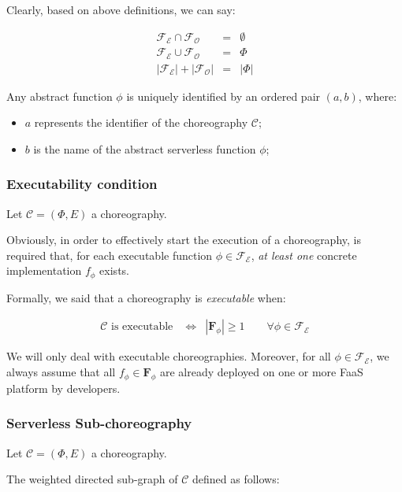 \documentclass[10pt,a4paper]{report}
\theoremstyle{definition}
\begin{document}
Clearly, based on above definitions, we can say: 

\begin{eqnarray}
	\mathscr{F_E} \cap \mathscr{F_O} & = & \emptyset \\
	\mathscr{F_E} \cup \mathscr{F_O} & = & \Phi \\
	|\mathscr{F_E}| + |\mathscr{F_O}| &=& |\Phi| 
\end{eqnarray}

Any abstract function $\phi$ is uniquely identified by an ordered pair $(a, b)$, where:
\begin{itemize}
	\item $a$ represents the identifier of the choreography $\mathcal{C}$;
	\item $b$ is the name of the abstract serverless function $\phi$;
\end{itemize}

\subsubsection{Executability condition}

Let $\mathcal{C} = (\Phi,E)$ a choreography.

Obviously, in order to effectively start the execution of a choreography, is required that, for each executable function $\phi \in \mathscr{F_E}$, \textit{at least one} concrete implementation $f_{\phi}$ exists.

Formally, we said that a choreography is \textit{executable} when: 

\begin{eqnarray}
	\label{eqn:SchedulabilityConditionOne}
	\mathcal{C} \text{ is executable } & \Leftrightarrow & |\textbf{F}_{\phi}| \geq 1 \qquad \forall \phi \in \mathscr{F_E}
\end{eqnarray}

We will only deal with executable choreographies. Moreover, for all $\phi \in \mathscr{F_E}$, we always assume that all $f_{\phi} \in \textbf{F}_{\phi}$ are already deployed on one or more FaaS platform by developers.

\subsubsection{Serverless Sub-choreography}

Let $\mathcal{C} = (\Phi,E)$ a choreography. 

The weighted directed sub-graph of $\mathcal{C}$ defined as follows:
\end{document}

